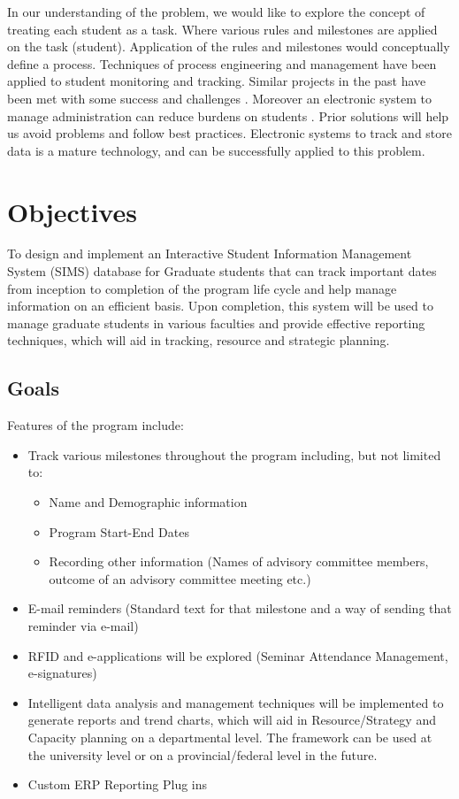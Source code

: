 \documentclass{journal}
\begin{document}
In our understanding of the problem, we would like to explore the concept of treating each student as a task. Where various rules and milestones are
applied on the task (student). Application of the rules and milestones would conceptually define a process. Techniques of process engineering and management 
have been applied to student monitoring and tracking. Similar projects in the past have been met with some success and challenges \cite{flex}. 
Moreover an electronic system to manage administration can reduce burdens on students \cite{adv}. Prior solutions will help us avoid problems and follow best practices. 
Electronic systems to track and store data is a mature technology, and can be successfully applied to this problem. 

\section{Objectives}

To design and implement an Interactive Student Information Management System (SIMS) database for Graduate students that can track important dates from inception 
to completion of the program life cycle and help manage information on an efficient basis. Upon completion, this system will be used to manage graduate students 
in various faculties and provide effective reporting techniques, which will aid in tracking, resource and strategic planning.
\subsection{ Goals }
 Features of the program include:
\begin{itemize}
 \item{Track various milestones throughout the program including, but not limited to:}
 \begin{itemize}
   \item{ Name and Demographic information }
   \item{ Program Start-End Dates }
   \item{ Recording other information (Names of advisory committee members, outcome of an advisory committee meeting etc.) }
  \end{itemize}
  \item{ E-mail reminders (Standard text for that milestone and a way of sending that reminder via e-mail) }
  \item{ RFID and e-applications will be explored (Seminar Attendance Management, e-signatures) }
  \item{ Intelligent data analysis and management techniques will be implemented to generate reports and trend charts, which will aid in Resource/Strategy and Capacity planning on a departmental level. The framework can be used at the university level or on a provincial/federal level in the future. } 
  \item{ Custom ERP Reporting Plug ins }
\end{itemize}
\end{document}
